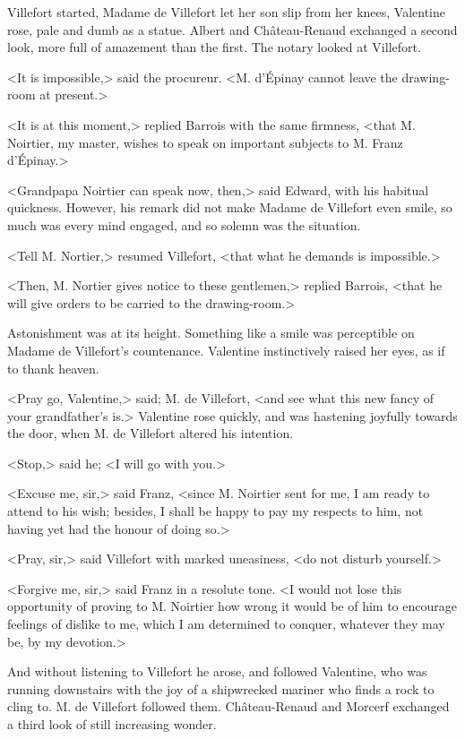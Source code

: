 Villefort started, Madame de Villefort let her son slip from her knees, Valentine rose, pale and dumb as a statue. Albert and Château-Renaud exchanged a second look, more full of amazement than the first. The notary looked at Villefort. 

 <It is impossible,> said the procureur. <M. d'Épinay cannot leave the drawing-room at present.> 

 <It is at this moment,> replied Barrois with the same firmness, <that M. Noirtier, my master, wishes to speak on important subjects to M. Franz d'Épinay.> 

 <Grandpapa Noirtier can speak now, then,> said Edward, with his habitual quickness. However, his remark did not make Madame de Villefort even smile, so much was every mind engaged, and so solemn was the situation. 

 <Tell M. Nortier,> resumed Villefort, <that what he demands is impossible.> 

 <Then, M. Nortier gives notice to these gentlemen,> replied Barrois, <that he will give orders to be carried to the drawing-room.> 

 Astonishment was at its height. Something like a smile was perceptible on Madame de Villefort's countenance. Valentine instinctively raised her eyes, as if to thank heaven. 

 <Pray go, Valentine,> said; M. de Villefort, <and see what this new fancy of your grandfather's is.> Valentine rose quickly, and was hastening joyfully towards the door, when M. de Villefort altered his intention. 

 <Stop,> said he; <I will go with you.> 

 <Excuse me, sir,> said Franz, <since M. Noirtier sent for me, I am ready to attend to his wish; besides, I shall be happy to pay my respects to him, not having yet had the honour of doing so.> 

 <Pray, sir,> said Villefort with marked uneasiness, <do not disturb yourself.>

<Forgive me, sir,> said Franz in a resolute tone. <I would not lose this opportunity of proving to M. Noirtier how wrong it would be of him to encourage feelings of dislike to me, which I am determined to conquer, whatever they may be, by my devotion.> 

 And without listening to Villefort he arose, and followed Valentine, who was running downstairs with the joy of a shipwrecked mariner who finds a rock to cling to. M. de Villefort followed them. Château-Renaud and Morcerf exchanged a third look of still increasing wonder. 